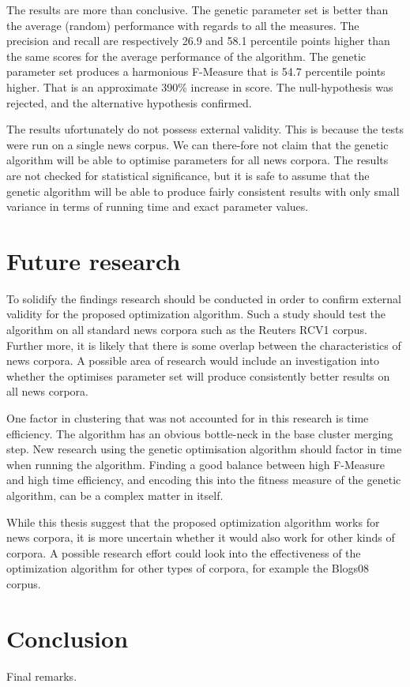 The results are more than conclusive. The genetic parameter set is better than the average (random) performance with regards to all the measures. The precision and recall are respectively 26.9 and 58.1 percentile points higher than the same scores for the average performance of the algorithm. The genetic parameter set produces a harmonious F-Measure that is 54.7 percentile points higher. That is an approximate 390\% increase in score. The null-hypothesis was rejected, and the alternative hypothesis confirmed.

The results ufortunately do not possess external validity. This is because the tests were run on a single news corpus. We can there-fore not claim that the genetic algorithm will be able to optimise parameters for all news corpora. The results are not checked for statistical significance, but it is safe to assume that the genetic algorithm will be able to produce fairly consistent results with only small variance in terms of running time and exact parameter values.

\section{Future research}
To solidify the findings research should be conducted in order to confirm external validity for the proposed optimization algorithm. Such a study should test the algorithm on all standard news corpora such as the Reuters RCV1 corpus. Further more, it is likely that there is some overlap between the characteristics of news corpora. A possible area of research would include an investigation into whether the optimises parameter set will produce consistently better results on all news corpora.

One factor in clustering that was not accounted for in this research is time efficiency. The \CTC algorithm has an obvious bottle-neck in the base cluster merging step. New research using the genetic optimisation algorithm should factor in time when running the algorithm. Finding a good balance between high F-Measure and high time efficiency, and encoding this into the fitness measure of the genetic algorithm, can be a complex matter in itself.

While this thesis suggest that the proposed optimization algorithm works for news corpora, it is more uncertain whether it would also work for other kinds of corpora. A possible research effort could look into the effectiveness of the optimization algorithm for other types of corpora, for example the Blogs08 corpus.

\section{Conclusion}
Final remarks.